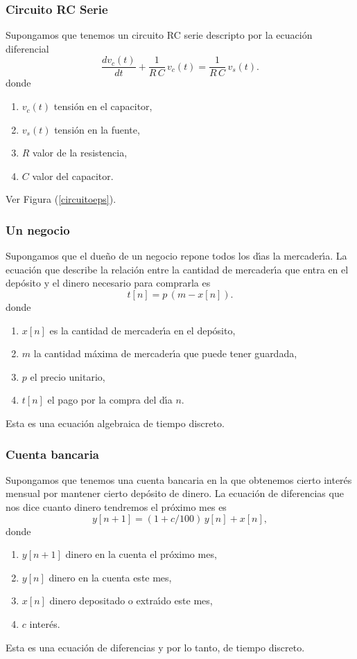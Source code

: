 \subsubsection{Circuito RC Serie}
Supongamos que tenemos un circuito RC serie descripto por la
ecuaci\'{o}n diferencial
\begin{equation}
  \frac{dv_{c}\left( t\right) }{dt}+\frac{1}{R \, C} \, v_{c}\left( t\right) =
  \frac{1}{R \, C} \, v_{s}\left( t\right) . \label{rcserie}
\end{equation}
donde
\begin{enumerate}
\item $v_{c}(t)$ tensi\'{o}n en el capacitor,
\item $v_{s}\left( t\right) $ tensi\'{o}n en la fuente,
\item $R$ valor de la resistencia,
\item $C$ valor del capacitor.
\end{enumerate}
Ver Figura (\ref{circuitoeps}).

\subsubsection{Un negocio}
Supongamos que el due\~{n}o de un negocio repone todos los d\'{\i}as
la mercader\'{\i}a.  La ecuaci\'{o}n que describe la relaci\'{o}n
entre la cantidad de mercader\'{\i}a que entra en el dep\'{o}sito y el
dinero necesario para comprarla es
\begin{equation}
  t[n] = p \, (m - x[n]).
\end{equation}
donde
\begin{enumerate}
\item $x[n]$ es la cantidad de mercader\'{\i}a en el dep\'{o}sito,
\item $m$ la cantidad m\'{a}xima de mercader\'{\i}a que puede tener
  guardada,
\item $p$ el precio unitario,
\item $t[n]$ el pago por la compra del d\'{\i}a $n$.
\end{enumerate}
Esta es una ecuaci\'{o}n algebraica de tiempo discreto.

\subsubsection{Cuenta bancaria}
Supongamos que tenemos una cuenta bancaria en la que obtenemos cierto
inter\'{e}s mensual por mantener cierto dep\'{o}sito de dinero.  La
ecuaci\'{o}n de diferencias que nos dice cuanto dinero tendremos el
pr\'{o}ximo mes es
\begin{equation}
  y\left[n+1\right] = (1+c/100) \, y[n]+x[n],
\end{equation}
donde
\begin{enumerate}
\item $y[n+1]$ dinero en la cuenta el pr\'{o}ximo mes,
\item $y[n]$ dinero en la cuenta este mes,
\item $x[n]$ dinero depositado o extra\'{\i}do este mes,
\item $c$ inter\'{e}s.
\end{enumerate}
Esta es una ecuaci\'{o}n de diferencias y por lo tanto, de tiempo
discreto.

